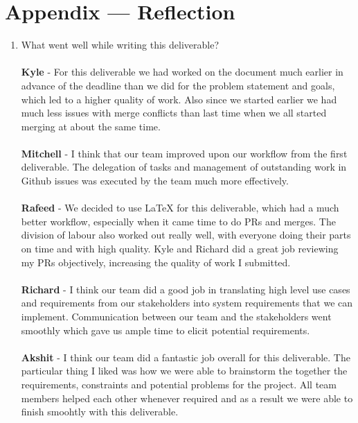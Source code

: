 \documentclass[12pt]{article}
\begin{document}
\section*{Appendix --- Reflection}
\begin{enumerate}
  \item What went well while writing this deliverable? \\
    \\
    \textbf{Kyle} - For this deliverable we had worked on the
    document much earlier in advance of the deadline than we did for
    the problem statement and goals, which led to a higher quality of
    work. Also since we started earlier we had much less issues with
    merge conflicts than last time when we all started merging at
    about the same time.\\
    \\
    \textbf{Mitchell} - I think that our team improved upon our
    workflow from the first deliverable. The delegation of tasks and
    management of outstanding work in Github issues was executed by
    the team much more effectively.\\
    \\
    \textbf{Rafeed} - We decided to use LaTeX for this deliverable,
    which had a much better workflow, especially when it came time to
    do PRs and merges. The division of labour also worked out really
    well, with everyone doing their parts on time and with high
    quality. Kyle and Richard did a great job reviewing my PRs
    objectively, increasing the quality of work I submitted. \\
    \\
    \textbf{Richard} - I think our team did a good job in translating high level
    use cases and requirements from our stakeholders into system requirements
    that we can implement. Communication between our team and the stakeholders
    went smoothly which gave us ample time to elicit potential requirements.\\
    \\
    \textbf{Akshit} - I think our team did a fantastic job overall
    for this deliverable.
    The particular thing I liked was how we were able to brainstorm
    the together the requirements,
    constraints and potential problems for the project. All team
    members helped each other whenever
    required and as a result we were able to finish smoohtly with
    this deliverable.\\


\end{enumerate}
\end{document}
